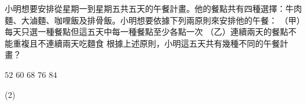 \begin{QUESTION}
    \begin{QBODY}
        小明想要安排從星期一到星期五共五天的午餐計畫。他的餐點共有四種選擇：牛肉麵、大滷麵、咖哩飯及排骨飯。小明想要依據下列兩原則來安排他的午餐：
        （甲）每天只選一種餐點但這五天中每一種餐點至少各點一次
        （乙）連續兩天的餐點不能重複且不連續兩天吃麵食
        根據上述原則，小明這五天共有幾種不同的午餐計畫？
        \begin{QOPS}
            \QOP $52$      
            \QOP $60$      
            \QOP $68$      
            \QOP $76$      
            \QOP $84$
        \end{QOPS}
            
    \end{QBODY}
    \begin{QFROMS}
    \end{QFROMS}
    \begin{QTAGS}
    \end{QTAGS}
    \begin{QANS}
        (2)
    \end{QANS}
    \begin{QSOL}
    \end{QSOL}
    \begin{QEMPTYSPACE}
    \end{QEMPTYSPACE}
\end{QUESTION}


